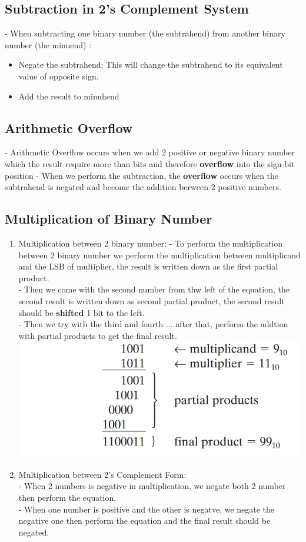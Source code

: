 \documentclass[12pt]{article}
\begin{document}
\subsection{Subtraction in 2's Complement System}
- When subtracting one binary number (the subtrahend) from another binary number (the minuend) :
\begin{itemize}
	\item Negate the subtrahend: This will change the subtrahend to its equivalent value of opposite sign.
	\item Add the result to minuhend
\end{itemize}
\subsection{Arithmetic Overflow}
- Arithmetic Overflow occurs when we add 2 positive or negative binary number which the result require more than bits and therefore \textbf{overflow} into the sign-bit position
- When we perform the subtraction, the \textbf{overflow} occurs when the subtrahend is negated and become the addition berween 2 positive numbers.
\subsection{Multiplication of Binary Number}
\begin{enumerate}
	\item Multiplication between 2 binary number:
	- To perform the multiplication between 2 binary number we perform the multiplication between multiplicand and the LSB of multiplier, the result is written down as the first partial product. \\
	- Then we come with the second number from thw left of the equation, the second result is written down as second partial product, the second result should be \textbf{shifted} 1 bit to the left. \\
	- Then we try with the third and fourth ... after that, perform the addtion with partial products to get the final result. \\
	\includegraphics[scale = 0.6]{hinh30}
	\bigbreak
	\item Multiplication between 2's Complement Form: \\
	- When 2 numbers is negative in multiplication, we negate both 2 number then perform the equation. \\
	- When one number is positive and the other is negatve, we negate the negative one then perform the equation and the final result should be negated.
\end{enumerate}
\end{document}
